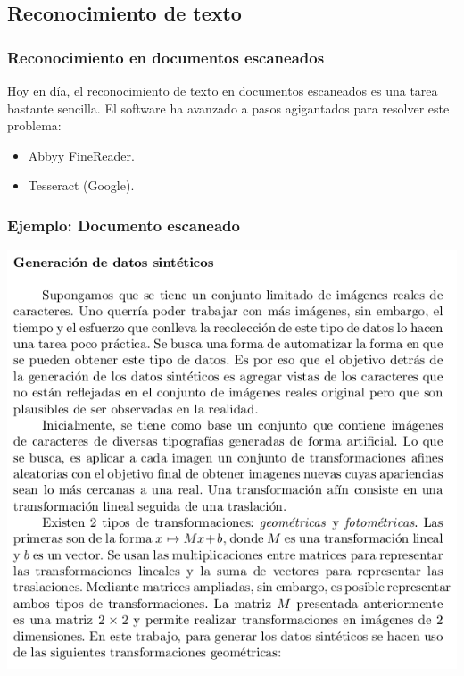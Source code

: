 	\subsection{Reconocimiento de texto}
		\begin{frame}
			\frametitle{Reconocimiento en documentos escaneados}
			Hoy en día, el reconocimiento de texto en documentos escaneados es una tarea bastante sencilla. El software ha avanzado a pasos agigantados para resolver este problema:
			\begin{itemize}
				\item Abbyy FineReader.
				\item Tesseract (Google).
			\end{itemize}
		\end{frame}
		\begin{frame}
			\frametitle{Ejemplo: Documento escaneado}
			\begin{center}
				\includegraphics[height=0.65\paperheight]{imgs/texto_plano.png}
			\end{center}
		\end{frame}
